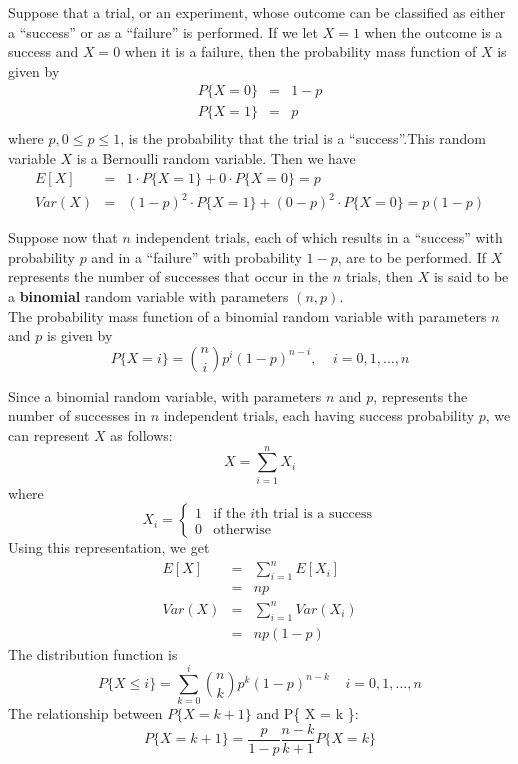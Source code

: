 \documentclass[12pt]{article}
\begin{document}
Suppose that a trial, or an experiment, whose outcome can be classified as either a ``success'' or as a ``failure'' is performed. If we let $X=1$ when the outcome is a success and $X=0$ when it is a failure, then the probability mass function of $X$ is given by
\begin{eqnarray*}
  P\{X=0\} &=& 1-p \\
  P\{X=1\} &=& p \\
\end{eqnarray*}
where $p, 0 \le p \le 1$, is the probability that the trial is a ``success''.This random variable $X$ is a Bernoulli random variable. Then we have
\begin{eqnarray*}
  E[X] &=& 1 \cdot P\{X=1\} + 0 \cdot P\{X=0\} = p \\
  Var(X) &=& (1-p)^2 \cdot P\{X=1\} + (0-p)^2 \cdot P\{X=0\} = p(1-p)
\end{eqnarray*}

Suppose now that $n$ independent trials, each of which results in a ``success'' with probability $p$ and in a ``failure'' with probability $1-p$, are to be performed. If $X$ represents the number of successes that occur in the $n$ trials, then $X$ is said to be a \textbf{binomial} random variable with parameters $(n,p)$. \\

The probability mass function of a binomial random variable with parameters $n$ and $p$ is given by
\begin{equation*}
  P\{ X=i \} = \binom{n}{i} p^i (1-p)^{n-i}, \;\;\;\; i =0,1,\dots,n
\end{equation*}

Since a binomial random variable, with parameters $n$ and $p$, represents the number of successes in $n$ independent trials, each having success probability $p$, we can represent $X$ as follows:
\begin{equation*}
  X = \sum_{i=1}^n X_i
\end{equation*}
where
\begin{equation*}
  X_i =
  \begin{cases}
    1 & \text{if the $i$th trial is a success} \\
    0 & \text{otherwise}
  \end{cases}
\end{equation*}
Using this representation, we get
\begin{eqnarray*}
  E[X]
  &=& \sum_{i=1}^n E[X_i] \\
  &=& np \\
  Var(X)
  &=& \sum_{i=1}^n Var(X_i) \\
  &=& np(1-p)
\end{eqnarray*}
The distribution function is
\begin{equation*}
  P\{ X \le i \}
  = \sum_{k=0}^i \binom{n}{k} p^k (1-p)^{n-k} \;\;\;\; i = 0,1,\dots,n
\end{equation*}
The relationship between $P\{ X = k+1 \}$ and P\{ X = k \}:
\begin{equation*}
  P\{ X = k+1 \}
  = \frac{p}{1-p} \frac{n-k}{k+1} P\{ X = k \}
\end{equation*}
\end{document}
